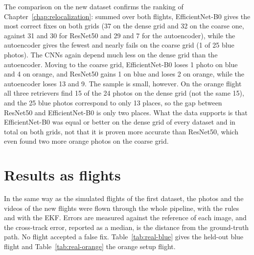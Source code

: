 \documentclass[english, Lau, oneside]{sapthesis}%
\begin{document}
The comparison on the new dataset confirms the ranking of Chapter~\ref{chap:relocalization}: summed over both flights, EfficientNet-B0 gives the most correct fixes on both grids (37 on the dense grid and 32 on the coarse one, against 31 and 30 for ResNet50 and 29 and 7 for the autoencoder), while the autoencoder gives the fewest and nearly fails on the coarse grid (1 of 25 blue photos). The CNNs again depend much less on the dense grid than the autoencoder. Moving to the coarse grid, EfficientNet-B0 loses 1 photo on blue and 4 on orange, and ResNet50 gains 1 on blue and loses 2 on orange, while the autoencoder loses 13 and 9. The sample is small, however. On the orange flight all three retrievers find 15 of the 24 photos on the dense grid (not the same 15), and the 25 blue photos correspond to only 13 places, so the gap between ResNet50 and EfficientNet-B0 is only two places. What the data supports is that EfficientNet-B0 was equal or better on the dense grid of every dataset and in total on both grids, not that it is proven more accurate than ResNet50, which even found two more orange photos on the coarse grid.

\section{Results as flights}
\label{sec:real-flights}
In the same way as the simulated flights of the first dataset, the photos and the videos of the new flights were flown through the whole pipeline, with the rules and with the EKF. Errors are measured against the reference of each image, and the cross-track error, reported as a median, is the distance from the ground-truth path. No flight accepted a false fix. Table~\ref{tab:real-blue} gives the held-out blue flight and Table~\ref{tab:real-orange} the orange setup flight.
\end{document}
